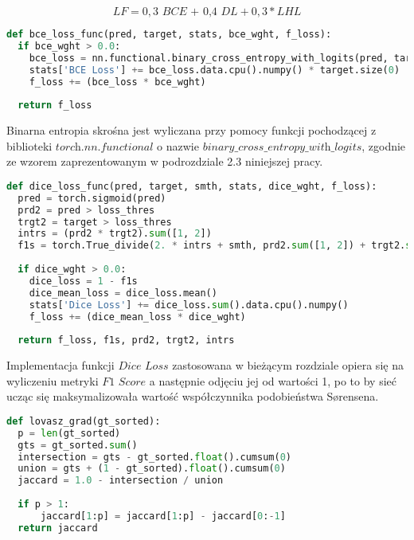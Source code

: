 \begin{equation}
LF = 0,3 \textit{ BCE + 0,4 } DL + 0,3 * LHL
\end{equation}

\cell
\begin{lstlisting}[name=Rozdzial3.1, language=Python]
def bce_loss_func(pred, target, stats, bce_wght, f_loss):
  if bce_wght > 0.0:
    bce_loss = nn.functional.binary_cross_entropy_with_logits(pred, target)
    stats['BCE Loss'] += bce_loss.data.cpu().numpy() * target.size(0)
    f_loss += (bce_loss * bce_wght)
  
  return f_loss
\end{lstlisting}

\cell
Binarna entropia skrośna jest wyliczana przy pomocy funkcji  pochodzącej z biblioteki $\textit{torch.nn.functional}$ o nazwie $\textit{binary$\_$cross$\_$entropy$\_$with$\_$logits}$, zgodnie ze wzorem zaprezentowanym w podrozdziale 2.3 niniejszej pracy.

\cell
\begin{lstlisting}[name=Rozdzial3.1, language=Python]
def dice_loss_func(pred, target, smth, stats, dice_wght, f_loss):
  pred = torch.sigmoid(pred)
  prd2 = pred > loss_thres
  trgt2 = target > loss_thres
  intrs = (prd2 * trgt2).sum([1, 2])
  f1s = torch.True_divide(2. * intrs + smth, prd2.sum([1, 2]) + trgt2.sum([1, 2]) + smth)
  
  if dice_wght > 0.0:
    dice_loss = 1 - f1s
    dice_mean_loss = dice_loss.mean()
    stats['Dice Loss'] += dice_loss.sum().data.cpu().numpy()
    f_loss += (dice_mean_loss * dice_wght)
  
  return f_loss, f1s, prd2, trgt2, intrs
\end{lstlisting}


\cell
Implementacja funkcji $\textit{Dice Loss}$ zastosowana w bieżącym rozdziale opiera się na wyliczeniu metryki $\textit{F1 Score}$ a następnie odjęciu jej od wartości 1, po to by sieć ucząc się maksymalizowała wartość współczynnika podobieństwa Sørensena.

\cell
\begin{lstlisting}[name=Rozdzial3.1, language=Python]
def lovasz_grad(gt_sorted):
  p = len(gt_sorted)
  gts = gt_sorted.sum()
  intersection = gts - gt_sorted.float().cumsum(0)
  union = gts + (1 - gt_sorted).float().cumsum(0)
  jaccard = 1.0 - intersection / union
  
  if p > 1:
      jaccard[1:p] = jaccard[1:p] - jaccard[0:-1]
  return jaccard
\end{lstlisting}


